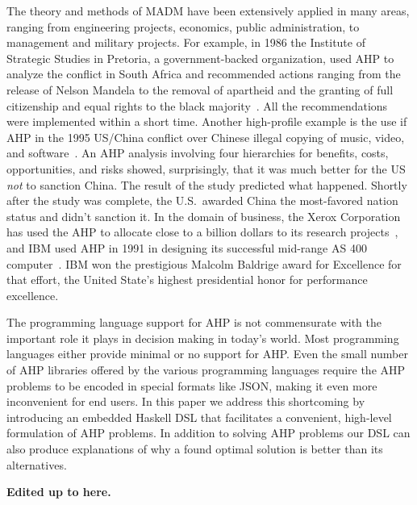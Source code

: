 \documentclass{jfp}
\newcommand{\NOTE}[2][gray]{\smallskip\noindent
  \colorbox{#1!30}{\parbox{.98\linewidth}{{\small\textbf{#2}}}}
}
\begin{document}
The theory and methods of MADM have been extensively applied in many areas, ranging from engineering projects, economics, public administration, to management and military projects.
%
For example, in 1986 the Institute of Strategic Studies in Pretoria, a government-backed organization, used AHP to analyze the conflict in South Africa and recommended actions ranging from the release of Nelson Mandela to the removal of apartheid and the granting of full citizenship and equal rights to the black majority~\citep{articleSaatySA}. All the recommendations were implemented within a short time. Another high-profile example is the use if AHP in the 1995 US/China conflict over Chinese illegal copying of music, video, and software~\citep{SAATY2001243}. An AHP analysis involving four hierarchies for benefits, costs, opportunities, and risks showed, surprisingly, that it was much better for the US \emph{not} to sanction China. The result of the study predicted what happened. Shortly after the study was complete, the U.S.\ awarded China the most-favored nation status and didn't sanction it.
%
In the domain of business, the Xerox Corporation has used the AHP to allocate close to a billion dollars to its research projects~\citep{Saaty2002DECISIONMW}, and IBM used AHP in 1991 in designing its successful mid-range AS 400 computer~\citep{TANG199222}. IBM won the prestigious Malcolm Baldrige award for Excellence for that effort, the United State's highest presidential honor for performance excellence.

The programming language support for AHP is not commensurate with the important role it plays in decision making in today's world. Most programming languages either provide minimal or no support for AHP. Even the small number of AHP libraries offered by the various programming languages require the AHP problems to be encoded in special formats like JSON, making it even more inconvenient for end users. 
%
In this paper we address this shortcoming by introducing an embedded Haskell DSL that facilitates a convenient, high-level formulation of AHP problems. In addition to solving AHP problems our DSL can also produce explanations of why a found optimal solution is better than its alternatives.

\NOTE{Edited up to here.}
\end{document}
